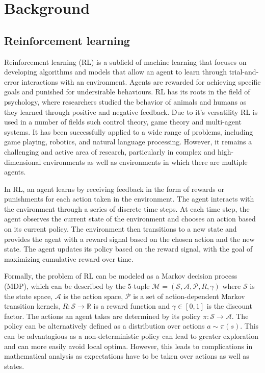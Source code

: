 \chapter{Background}

\section{Reinforcement learning}
\label{sec:RL}
Reinforcement learning (RL) is a subfield of machine learning that focuses on developing algorithms and models that allow an agent to learn through trial-and-error interactions with an environment. Agents are rewarded for achieving specific goals and punished for undersirable behaviours. RL has its roots in the field of psychology, where researchers studied the behavior of animals and humans as they learned through positive and negative feedback. Due to it's versatility RL is used in a number of fields such control theory, game theory and multi-agent systems. It has been successfully applied to a wide range of problems, including game playing, robotics, and natural language processing. However, it remains a challenging and active area of research, particularly in complex and high-dimensional environments as well as environments in which there are multiple agents. 

In RL, an agent learns by receiving feedback in the form of rewards or punishments for each action taken in the environment. The agent interacts with the environment through a series of discrete time steps. At each time step, the agent observes the current state of the environment and chooses an action based on its current policy. The environment then transitions to a new state and provides the agent with a reward signal based on the chosen action and the new state. The agent updates its policy based on the reward signal, with the goal of maximizing cumulative reward over time.

Formally, the problem of RL can be modeled as a Markov decision process (MDP), which can be described by the 5-tuple $\mathcal{M} = (\mathcal{S}, \mathcal{A}, \mathcal{P}, R,\gamma)$ where $\mathcal{S}$ is the state space, $\mathcal{A}$ is the action space, $\mathcal{P}$ is a set of action-dependent Markov transition kernels, $R: \mathcal{S} \rightarrow \mathbb{R}$ is a reward function and $\gamma \in [0,1]$ is the discount factor.
The actions an agent takes are determined by its policy $\pi: \mathcal{S} \rightarrow \mathcal{A}$. The policy can be alternatively defined as a distribution over actions $a \sim \pi(s)$. This can be advantagious as a non-deterministic policy can lead to greater exploration and can more easily avoid local optima. However, this leads to complications in mathematical analysis as expectations have to be taken over actions as well as states.

